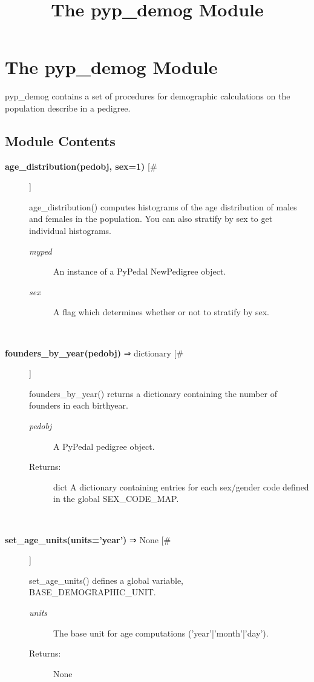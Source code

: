 \documentclass[10pt]{article}
\title{The pyp\_demog Module}
\begin{document}
\section*{The pyp\_demog Module}


 pyp\_demog contains a set of procedures for demographic calculations on the population describe in a pedigree.
\subsection*{Module Contents}
\begin{description}
\item[\textbf{age\_distribution(pedobj, sex=1)}
 [\#]]

 age\_distribution() computes histograms of the age distribution of males and females in the population. You can also stratify by sex to get individual histograms.
\begin{description}
\item[\emph{myped}
] An instance of a PyPedal NewPedigree object.
\item[\emph{sex}
] A flag which determines whether or not to stratify by sex.

\end{description}
\\ 

\item[\textbf{founders\_by\_year(pedobj)}
 ⇒ dictionary [\#]]

 founders\_by\_year() returns a dictionary containing the number of founders in each birthyear.
\begin{description}
\item[\emph{pedobj}
] A PyPedal pedigree object.
\item[Returns:] dict A dictionary containing entries for each sex/gender code defined in the global SEX\_CODE\_MAP.

\end{description}
\\ 

\item[\textbf{set\_age\_units(units='year')}
 ⇒ None [\#]]

 set\_age\_units() defines a global variable, BASE\_DEMOGRAPHIC\_UNIT.
\begin{description}
\item[\emph{units}
] The base unit for age computations ('year'|'month'|'day').
\item[Returns:] None

\end{description}
\\ 


\end{description}
\end{document}
